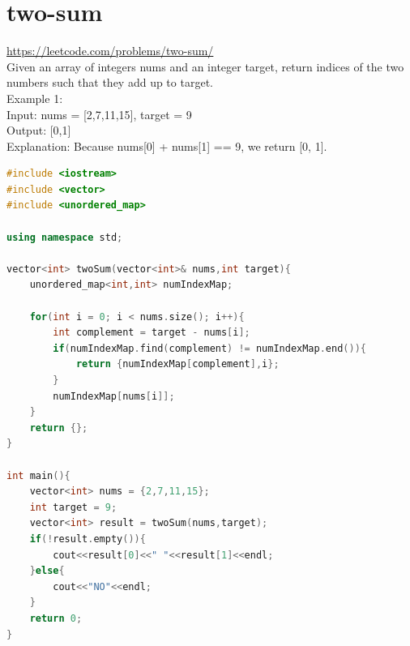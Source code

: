 \documentclass[12pt,twiside,a4paper]{ctexbook}
\numberwithin{chapter}{part}
\begin{document}

\section{two-sum}
\url{https://leetcode.com/problems/two-sum/}\\
Given an array of integers nums and an integer target, return indices of the two numbers such that they add up to target.\\
Example 1:\\
Input: nums = [2,7,11,15], target = 9\\
Output: [0,1]\\
Explanation: Because nums[0] + nums[1] == 9, we return [0, 1].\\
\begin{lstlisting}[language=C++,breaklines = true]
#include <iostream>
#include <vector>
#include <unordered_map>

using namespace std;

vector<int> twoSum(vector<int>& nums,int target){
	unordered_map<int,int> numIndexMap;

	for(int i = 0; i < nums.size(); i++){
		int complement = target - nums[i];
		if(numIndexMap.find(complement) != numIndexMap.end()){
			return {numIndexMap[complement],i};
		}
		numIndexMap[nums[i]];
	}
	return {};
}

int main(){
	vector<int> nums = {2,7,11,15};
	int target = 9;
	vector<int> result = twoSum(nums,target);
	if(!result.empty()){
		cout<<result[0]<<" "<<result[1]<<endl;
	}else{
		cout<<"NO"<<endl;
	}
	return 0;
}
\end{lstlisting}

\clearpage
\end{document}
